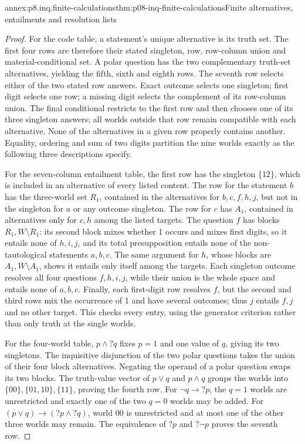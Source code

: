 \begin{annexitem}{annex:p8.inq.finite-calculations}{thm:p08-inq-finite-calculations}{Finite alternatives, entailments and resolution lists}
\begin{proof}
For the code table, a statement's unique alternative is its truth
set. The first four rows are therefore their stated singleton,
row, row-column union and material-conditional set. A polar question
has the two complementary truth-set alternatives, yielding the
fifth, sixth and eighth rows. The seventh row selects either of
the two stated row answers. Exact outcome selects one singleton;
first digit selects one row; a missing digit selects the complement
of its row-column union. The final conditional restricts to the
first row and then chooses one of its three singleton answers;
all worlds outside that row remain compatible with each alternative.
None of the alternatives in a given row properly contains another.
Equality, ordering and sum of two digits partition the nine worlds
exactly as the following three descriptions specify.

For the seven-column entailment table, the first row has the
singleton \(\{12\}\), which is included in an alternative of
every listed content. The row for the statement \(b\) has the
three-world set \(R_1\), contained in the alternatives for
\(b,c,f,h,j\), but not in the singleton for \(a\) or any
outcome singleton. The row for \(c\) has \(A_1\), contained
in alternatives only for \(c,h\) among the listed targets.
The question \(f\) has blocks \(R_1,W\setminus R_1\): its
second block mixes whether 1 occurs and mixes first digits, so
it entails none of \(h,i,j\), and its total presupposition entails
none of the non-tautological statements \(a,b,c\). The same
argument for \(h\), whose blocks are \(A_1,W\setminus A_1\),
shows it entails only itself among the targets. Each singleton
outcome resolves all four questions \(f,h,i,j\), while their
union is the whole space and entails none of \(a,b,c\).
Finally, each first-digit row resolves \(f\), but the second
and third rows mix the occurrence of 1 and have several outcomes;
thus \(j\) entails \(f,j\) and no other target. This checks
every entry, using the generator criterion rather than only truth
at the single worlds.

For the four-world table, \(p\land?q\) fixes \(p=1\) and
one value of \(q\), giving its two singletons. The inquisitive
disjunction of the two polar questions takes the union of their
four block alternatives. Negating the operand of a polar question
swaps its two blocks. The truth-value vector of \(p\lor q\)
and \(p\land q\) groups the worlds into
\(\{00\},\{01,10\},\{11\}\), proving the fourth row.
For \(\neg q\to?p\), the \(q=1\) worlds are unrestricted
and exactly one of the two \(q=0\) worlds may be added.
For \((p\lor q)\to(?p\land?q)\), world 00 is unrestricted
and at most one of the other three worlds may remain. The
equivalence of \(?p\) and \(?\neg p\) proves the seventh row.


\end{proof}
\end{annexitem}
